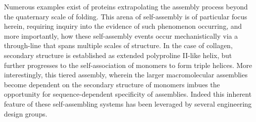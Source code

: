 \begin{refsection}
Numerous examples exist of proteins extrapolating the assembly process beyond
the quaternary scale of folding. This arena of self-assembly is of particular
focus herein, requiring inquiry into the evidence of such phenomenon occurring,
and more importantly, how these self-assembly events occur mechanistically via a
through-line that spans multiple scales of structure. In the case of collagen,
secondary structure is established as extended polyproline II-like helix, but
further progresses to the self-association of monomers to form triple helices.
More interestingly, this tiered assembly, wherein the larger macromolecular
assemblies become dependent on the secondary structure of monomers imbues the
opportunity for sequence-dependent specificity of assemblies. Indeed this
inherent feature of these self-assembling systems has been leveraged by several
engineering design groups.\cite{Kar2009,Stahl2010a,Fletcher2012}


\end{refsection}
